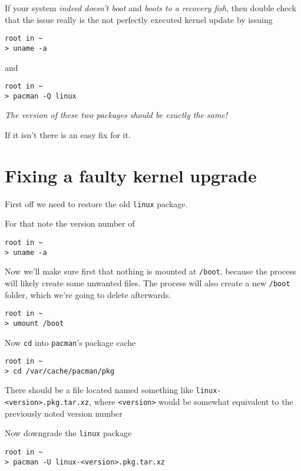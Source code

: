 \documentclass[10pt]{dustdoc}
\begin{document}
If your system \emph{indeed doesn’t boot} and \emph{boots to a recovery fish}, then double check that the issue really is the not perfectly executed kernel update by issuing

\begin{verbatim}
root in ~
> uname -a
\end{verbatim}


\noindent
and

\begin{verbatim}
root in ~
> pacman -Q linux
\end{verbatim}


\emph{The version of these two packages should be exactly the same!}

If it isn’t there is an easy fix for it.

\section{Fixing a faulty kernel upgrade}%
\label{sec:fixing-a-faulty-kernel-upgrade}

First off we need to restore the old \texttt{linux} package.

For that note the version number of

\begin{verbatim}
root in ~
> uname -a
\end{verbatim}


Now we’ll make sure first that nothing is mounted at \texttt{/boot}, because the process will likely create some unwanted files.
The process will also create a new \texttt{/boot} folder, which we’re going to delete afterwards.

\begin{verbatim}
root in ~
> umount /boot
\end{verbatim}


Now \texttt{cd} into \texttt{pacman}'s package cache

\begin{verbatim}
root in ~
> cd /var/cache/pacman/pkg
\end{verbatim}


There should be a file located named something like \texttt{linux-<version>.pkg.tar.xz}, where \texttt{<version>} would be somewhat equivalent to the previously noted version number

Now downgrade the \texttt{linux} package

\begin{verbatim}
root in ~
> pacman -U linux-<version>.pkg.tar.xz
\end{verbatim}
\end{document}
